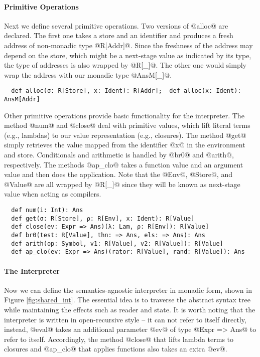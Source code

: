 \paragraph{Primitive Operations} Next we define several primitive operations.
Two versions of @alloc@ are declared. The first one takes a store and an
identifier and produces a fresh address of non-monadic type @R[Addr]@. Since
the freshness of the address may depend on the store, which might be a
next-stage value as indicated by its type, the type of addresses is also wrapped
by @R[_]@. The other one would simply wrap the address with our monadic type
@AnsM[_]@.
\begin{lstlisting}
  def alloc(σ: R[Store], x: Ident): R[Addr];  def alloc(x: Ident): AnsM[Addr]
\end{lstlisting}

Other primitive operations provide basic functionality for the interpreter.
The method @num@ and @close@ deal with primitive values, which lift literal
terms (e.g., lambdas) to our value representation (e.g., closures).
The method @get@ simply retrieves the value mapped from the identifier @x@ in
the environment and store. Conditionals and arithmetic is handled by @br0@
and @arith@, respectively. The methods @ap_clo@ takes a function value and an
argument value and then does the application. Note that the @Env@, @Store@, and
@Value@ are all wrapped by @R[_]@ since they will be known as next-stage value
when acting as compilers.


\begin{lstlisting}
  def num(i: Int): Ans
  def get(σ: R[Store], ρ: R[Env], x: Ident): R[Value]
  def close(ev: Expr => Ans)(λ: Lam, ρ: R[Env]): R[Value]
  def br0(test: R[Value], thn: => Ans, els: => Ans): Ans
  def arith(op: Symbol, v1: R[Value], v2: R[Value]): R[Value]
  def ap_clo(ev: Expr => Ans)(rator: R[Value], rand: R[Value]): Ans
\end{lstlisting}

\paragraph{The Interpreter} Now we can define the semantics-agnostic interpreter
in monadic form, shown in Figure \ref{fig:shared_int}.
The essential idea is to traverse the abstract syntax tree while maintaining the
effects such as reader and state.
It is worth noting that the interpreter is written in open-recursive style -- it
can not refer to itself directly, instead, @eval@ takes an additional parameter
@ev@ of type @Expr => Ans@ to refer to itself. Accordingly, the method @close@
that lifts lambda terms to closures and @ap_clo@ that applies functions also
takes an extra @ev@.

